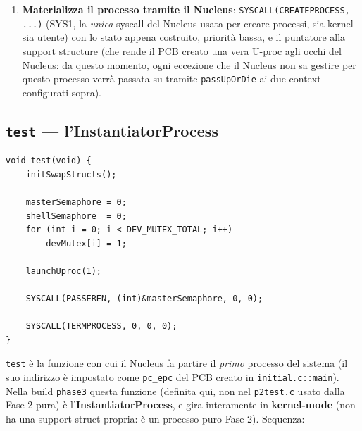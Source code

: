 \documentclass[11pt,a4paper]{article}
\newcommand{\code}[1]{\texttt{#1}}
\newcommand{\func}[1]{\textbf{\texttt{#1}}}
\begin{document}
\begin{enumerate}
\begin{itemize}
    campo alto del registro \code{EntryHI}, così che ogni traduzione TLB
    generata da questa U-proc sia automaticamente taggata con il suo ASID
    (permettendo al TLB di distinguere le pagine di U-proc diverse senza
    doverlo invalidare interamente a ogni cambio di processo).
  \end{itemize}
\item \textbf{Materializza il processo tramite il Nucleus}:
  \code{SYSCALL(CREATEPROCESS, ...)} (SYS1, la \emph{unica} syscall del
  Nucleus usata per creare processi, sia kernel sia utente) con lo stato
  appena costruito, priorità bassa, e il puntatore alla support structure
  (che rende il PCB creato una vera U-proc agli occhi del Nucleus: da questo
  momento, ogni eccezione che il Nucleus non sa gestire per questo processo
  verrà passata su tramite \code{passUpOrDie} ai due context configurati
  sopra).
\end{enumerate}

\subsection{\func{test} --- l'InstantiatorProcess}
\begin{lstlisting}
void test(void) {
    initSwapStructs();

    masterSemaphore = 0;
    shellSemaphore  = 0;
    for (int i = 0; i < DEV_MUTEX_TOTAL; i++)
        devMutex[i] = 1;

    launchUproc(1);

    SYSCALL(PASSEREN, (int)&masterSemaphore, 0, 0);

    SYSCALL(TERMPROCESS, 0, 0, 0);
}
\end{lstlisting}
\code{test} è la funzione con cui il Nucleus fa partire il \emph{primo}
processo del sistema (il suo indirizzo è impostato come \code{pc\_epc} del
PCB creato in \code{initial.c::main}). Nella build \code{phase3} questa
funzione (definita qui, non nel \code{p2test.c} usato dalla Fase 2 pura) è
l'\textbf{InstantiatorProcess}, e gira interamente in \textbf{kernel-mode}
(non ha una support struct propria: è un processo puro Fase 2). Sequenza:
\end{document}
